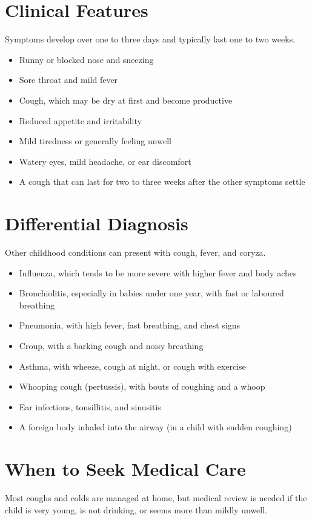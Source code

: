 \section*{Clinical Features}
Symptoms develop over one to three days and typically last one to two weeks.

\begin{itemize}
    \item Runny or blocked nose and sneezing
    \item Sore throat and mild fever
    \item Cough, which may be dry at first and become productive
    \item Reduced appetite and irritability
    \item Mild tiredness or generally feeling unwell
    \item Watery eyes, mild headache, or ear discomfort
    \item A cough that can last for two to three weeks after the other symptoms settle
\end{itemize}

\section*{Differential Diagnosis}
Other childhood conditions can present with cough, fever, and coryza.

\begin{itemize}
    \item Influenza, which tends to be more severe with higher fever and body aches
    \item Bronchiolitis, especially in babies under one year, with fast or laboured breathing
    \item Pneumonia, with high fever, fast breathing, and chest signs
    \item Croup, with a barking cough and noisy breathing
    \item Asthma, with wheeze, cough at night, or cough with exercise
    \item Whooping cough (pertussis), with bouts of coughing and a whoop
    \item Ear infections, tonsillitis, and sinusitis
    \item A foreign body inhaled into the airway (in a child with sudden coughing)
\end{itemize}

\section*{When to Seek Medical Care}
Most coughs and colds are managed at home, but medical review is needed if the child is very young, is not drinking, or seems more than mildly unwell.

